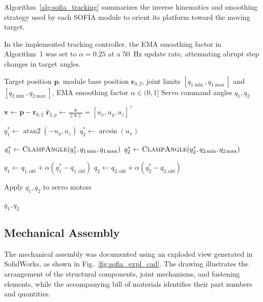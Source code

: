 \documentclass[lettersize,journal]{IEEEtran}
\begin{document}
	Algorithm~\ref{alg:sofia_tracking} summarizes the inverse kinematics and smoothing strategy used by each SOFIA module to orient its platform toward the moving target.
	
	In the implemented tracking controller, the EMA smoothing factor in Algorithm~1 was set to $\alpha = 0.25$ at a 50~Hz update rate, attenuating abrupt step changes in target angles.
	
	\begin{algorithm}[!t]
		\caption{SOFIA module target tracking control}
		\label{alg:sofia_tracking}
		
		
		\begin{algorithmic}[1]
			
			\Require Target position $\mathbf{p}$, module base position $\mathbf{r}_{0,2}$, joint limits $[q_{1\min}, q_{1\max}]$ and $[q_{2\min}, q_{2\max}]$, EMA smoothing factor $\alpha \in (0, 1]$
			\Ensure Servo command angles $q_1, q_2$
			
			\State $\mathbf{v} \gets \mathbf{p} - \mathbf{r}_{0,2}$
			\State $\hat{\mathbf{r}}_{2,p} \gets \frac{\mathbf{v}}{\|\mathbf{v}\|} = [u_x, u_y, u_z]^\top$ 
			
			\State $q_1^* \gets \operatorname{atan2}(-u_y, u_z)$
			\State $q_2^* \gets \arcsin(u_x)$ 
			
			\State $q_1^* \gets \Call{ClampAngle}{q_1^*, q_{1\min}, q_{1\max}}$
			\State $q_2^* \gets \Call{ClampAngle}{q_2^*, q_{2\min}, q_{2\max}}$
			
			\State $q_1 \gets q_{1,\text{old}} + \alpha (q_1^* - q_{1,\text{old}})$ 
			\State $q_2 \gets q_{2,\text{old}} + \alpha (q_2^* - q_{2,\text{old}})$
			
			\State Apply $q_1, q_2$ to servo motors
			
			\State \Return $q_1, q_2$
			
		\end{algorithmic}
	\end{algorithm}
	
	\subsection{Mechanical Assembly}
	The mechanical assembly was documented using an exploded
	view generated in SolidWorks, as shown in
	Fig.~\ref{fig:sofia_expl_cad}. The drawing illustrates
	the arrangement of the structural components,
	joint mechanisms, and fastening elements, while the
	accompanying bill of materials identifies their
	part numbers and quantities.
	
\end{document}

